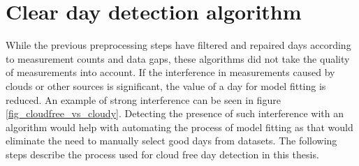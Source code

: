 








\section{Clear day detection algorithm}
\label{clearskyalgo_chapter}
While the previous preprocessing steps have filtered and repaired days according to measurement counts and data gaps, these algorithms did not take the quality of measurements into account. If the interference in measurements caused by clouds or other sources is significant, the value of a day for model fitting is reduced. An example of strong interference can be seen in figure \ref{fig_cloudfree_vs_cloudy}. Detecting the presence of such interference with an algorithm would help with automating the process of model fitting as that would eliminate the need to manually select good days from datasets. The following steps describe the process used for cloud free day detection in this thesis.




